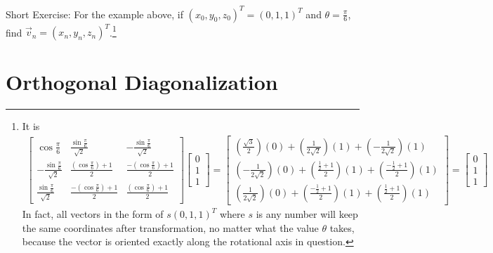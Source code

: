 Short Exercise: For the example above, if $(x_0, y_0, z_0)^T = (0,1,1)^T$ and $\theta = \frac{\pi}{6}$, find $\vec{v}_n = (x_n, y_n, z_n)^T$.\footnote{It is
\begin{align*}
\begin{bmatrix}
\cos{\frac{\pi}{6}} & \frac{\sin{\frac{\pi}{6}}}{\sqrt{2}} & -\frac{\sin{\frac{\pi}{6}}}{\sqrt{2}} \\
-\frac{\sin{\frac{\pi}{6}}}{\sqrt{2}} & \frac{(\cos{\frac{\pi}{6}}) + 1}{2} & \frac{-(\cos{\frac{\pi}{6}}) + 1}{2} \\
\frac{\sin\frac{\pi}{6}}{\sqrt{2}} & \frac{-(\cos{\frac{\pi}{6}}) + 1}{2} & \frac{(\cos{\frac{\pi}{6}}) + 1}{2}
\end{bmatrix}
\begin{bmatrix}
0 \\
1 \\
1
\end{bmatrix}
=
\begin{bmatrix}
(\frac{\sqrt{3}}{2})(0) + (\frac{1}{2\sqrt{2}})(1) + (-\frac{1}{2\sqrt{2}})(1) \\
(-\frac{1}{2\sqrt{2}})(0) + (\frac{\frac{1}{2} + 1}{2})(1) + (\frac{-\frac{1}{2} + 1}{2})(1) \\
(\frac{1}{2\sqrt{2}})(0) + (\frac{-\frac{1}{2} + 1}{2})(1) + (\frac{\frac{1}{2} + 1}{2})(1)
\end{bmatrix}
=
\begin{bmatrix}
0 \\
1 \\
1
\end{bmatrix}
\end{align*}
In fact, all vectors in the form of $s(0,1,1)^T$ where $s$ is any number will keep the same coordinates after transformation, no matter what the value $\theta$ takes, because the vector is oriented exactly along the rotational axis in question.}

\section{Orthogonal Diagonalization}
\label{section:orthogonaldiagreal}

